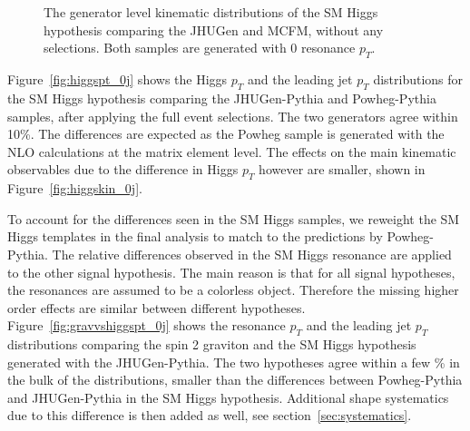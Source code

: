 \begin{figure}[!hbtp]
{}\\
\\
\caption{The generator level kinematic distributions of the SM Higgs hypothesis 
comparing the JHUGen and MCFM, without any selections. Both samples 
are generated with 0 resonance $p_T$. 
}
\label{fig:jhuvsmcfm}
\end{figure}

Figure~\ref{fig:higgspt_0j} shows the Higgs $p_T$ and the leading jet 
$p_T$ distributions for the SM Higgs hypothesis comparing the 
JHUGen-Pythia and Powheg-Pythia~\cite{powheg} samples, after applying the full 
event selections. The two generators agree within 10\%. 
The differences are expected as the Powheg sample is generated with the 
NLO calculations at the matrix element level. 
The effects on the main kinematic observables due to 
the difference in Higgs $p_T$ however are smaller, shown in Figure~\ref{fig:higgskin_0j}. 

To account for the differences seen in the SM Higgs samples, 
we reweight the SM Higgs templates in the final analysis 
to match to the predictions by Powheg-Pythia. 
The relative differences observed in the SM Higgs resonance are 
applied to the other signal hypothesis. 
The main reason is that for all signal hypotheses, the resonances 
are assumed to be a colorless object. Therefore the missing higher 
order effects are similar between different hypotheses. 
Figure~\ref{fig:gravvshiggspt_0j} shows the resonance $p_T$ and 
the leading jet $p_T$ distributions comparing the spin 2 
graviton and the SM Higgs hypothesis generated with the JHUGen-Pythia. 
The two hypotheses agree within a few \% in the bulk of the distributions, 
smaller than the differences between Powheg-Pythia and JHUGen-Pythia 
in the SM Higgs hypothesis. 
Additional shape systematics due to this difference is then added as well, see section~\ref{sec:systematics}. 



